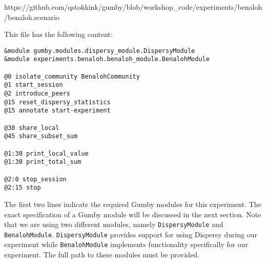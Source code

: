 \documentclass{article}
\begin{document}
https://github.com/qstokkink/gumby/blob/workshop\_code/experiments/benaloh/benaloh.scenario

This file has the following content:

\begin{lstlisting}[frame=single]
&module gumby.modules.dispersy_module.DispersyModule
&module experiments.benaloh.benaloh_module.BenalohModule

@0 isolate_community BenalohCommunity
@1 start_session
@2 introduce_peers
@15 reset_dispersy_statistics
@15 annotate start-experiment

@30 share_local
@45 share_subset_sum

@1:30 print_local_value
@1:30 print_total_sum

@2:0 stop_session
@2:15 stop
\end{lstlisting}

The first two lines indicate the required Gumby modules for this experiment.
The exact specification of a Gumby module will be discussed in the next section.
Note that we are using two different modules, namely \texttt{DispersyModule} and \texttt{BenalohModule}.
\texttt{DispersyModule} provides support for using Dispersy during our experiment while \texttt{BenalohModule} implements functionality specifically for our experiment.
The full path to these modules must be provided.
\end{document}

